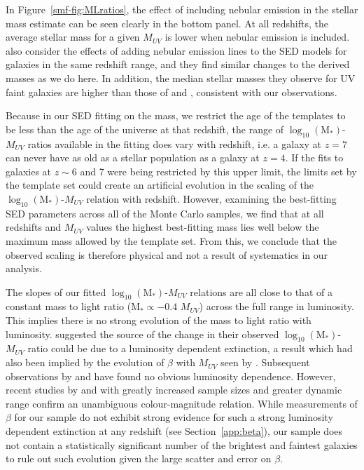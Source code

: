 In Figure~\ref{smf-fig:MLratios}, the effect of including nebular emission in the stellar mass estimate can be seen clearly in the bottom panel. At all redshifts, the average stellar mass for a given $M_{UV}$ is lower when nebular emission is included. \citet{2015ApJ...799..183S} also consider the effects of adding nebular emission lines to the SED models for galaxies in the same redshift range, and they find similar changes to the derived masses as we do here. In addition, the median stellar masses they observe for UV faint galaxies are higher than those of \citet{Gonzalez:2011dn} and \citet{2012ApJ...752...66L}, consistent with our observations.

Because in our SED fitting on the mass, we restrict the age of the templates to be less than the age of the universe at that redshift, the range of $\log_{10} (\text{M}_{*})$-$M_{UV}$ ratios available in the fitting does vary with redshift, i.e. a galaxy at $z = 7$ can never have as old as a stellar population as a galaxy at $z = 4$. If the fits to galaxies at $z \sim 6$ and 7 were being restricted by this upper limit, the limits set by the template set could create an artificial evolution in the scaling of the $\log_{10} (\text{M}_{*})$-$M_{UV}$ relation with redshift. However, examining the best-fitting SED parameters across all of the Monte Carlo samples, we find that at all redshifts and $M_{UV}$ values the highest best-fitting mass lies well below the maximum mass allowed by the template set. From this, we conclude that the observed scaling is therefore physical and not a result of systematics in our analysis. 

The slopes of our fitted $\log_{10} (\text{M}_{*})$-$M_{UV}$ relations are all close to that of a constant mass to light ratio (M$_{*} \propto -0.4$ $M_{UV}$) across the full range in luminosity. This implies there is no strong evolution of the mass to light ratio with luminosity. \citet{2012ApJ...752...66L} suggested the source of the change in their observed $\log_{10} (\text{M}_{*})$-$M_{UV}$ ratio could be due to a luminosity dependent extinction, a result which had also been implied by the evolution of $\beta$ with $M_{UV}$ seen by \citet{2012ApJ...754...83B}. Subsequent observations by \citet{Dunlop:2011jl} and \citet{2012ApJ...756..164F} have found no obvious luminosity dependence. However, recent studies by \citet{Bouwens:2013vf} and \citep{Rogers:2014bn} with greatly increased sample sizes and greater dynamic range confirm an unambiguous colour-magnitude relation. While measurements of $\beta$ for our sample do not exhibit strong evidence for such a strong luminosity dependent extinction at any redshift (see Section~\ref{app:beta}), our sample does not contain a statistically significant number of the brightest and faintest galaxies to rule out such evolution given the large scatter and error on $\beta$. 


